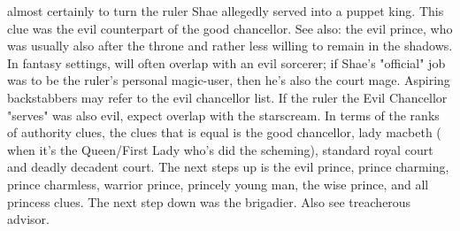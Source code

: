 \documentclass[12pt]{book}
\begin{document}
almost certainly to turn the ruler Shae allegedly served into a puppet king. This clue was the evil counterpart of the good chancellor. See also: the evil prince, who was usually also after the throne and rather less willing to remain in the shadows. In fantasy settings, will often overlap with an evil sorcerer; if Shae's "official" job was to be the ruler's personal magic-user, then he's also the court mage. Aspiring backstabbers may refer to the evil chancellor list. If the ruler the Evil Chancellor "serves" was also evil, expect overlap with the starscream. In terms of the ranks of authority clues, the clues that is equal is the good chancellor, lady macbeth ( when it's the Queen/First Lady who's did the scheming), standard royal court and deadly decadent court. The next steps up is the evil prince, prince charming, prince charmless, warrior prince, princely young man, the wise prince, and all princess clues. The next step down was the brigadier. Also see treacherous advisor.
\end{document}
